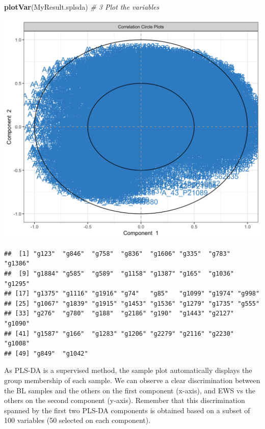 \documentclass[]{book}
\newenvironment{Shaded}{\begin{snugshade}}{\end{snugshade}}
\newcommand{\KeywordTok}[1]{\textcolor[rgb]{0.13,0.29,0.53}{\textbf{#1}}}
\newcommand{\DataTypeTok}[1]{\textcolor[rgb]{0.13,0.29,0.53}{#1}}
\newcommand{\DecValTok}[1]{\textcolor[rgb]{0.00,0.00,0.81}{#1}}
\newcommand{\CommentTok}[1]{\textcolor[rgb]{0.56,0.35,0.01}{\textit{#1}}}
\newcommand{\OperatorTok}[1]{\textcolor[rgb]{0.81,0.36,0.00}{\textbf{#1}}}
\newcommand{\NormalTok}[1]{#1}
\theoremstyle{definition}
\theoremstyle{definition}
\theoremstyle{definition}
\theoremstyle{remark}
\begin{document}
\begin{Shaded}
\begin{Highlighting}[]
\KeywordTok{plotVar}\NormalTok{(MyResult.splsda)                            }\CommentTok{# 3 Plot the variables}
\end{Highlighting}
\end{Shaded}

\begin{center}\includegraphics[width=0.5\linewidth]{Figures/unnamed-chunk-2-2} \end{center}

\begin{Shaded}
\end{Shaded}

\begin{verbatim}
##  [1] "g123"  "g846"  "g758"  "g836"  "g1606" "g335"  "g783"  "g1386"
##  [9] "g1884" "g585"  "g589"  "g1158" "g1387" "g165"  "g1036" "g1295"
## [17] "g1375" "g1116" "g1916" "g74"   "g85"   "g1099" "g1974" "g998" 
## [25] "g1067" "g1839" "g1915" "g1453" "g1536" "g1279" "g1735" "g555" 
## [33] "g276"  "g780"  "g188"  "g2186" "g190"  "g1443" "g2127" "g1090"
## [41] "g1587" "g166"  "g1283" "g1206" "g2279" "g2116" "g2230" "g1008"
## [49] "g849"  "g1042"
\end{verbatim}

As PLS-DA is a supervised method, the sample plot automatically displays
the group membership of each sample. We can observe a clear
discrimination between the BL samples and the others on the first
component (x-axis), and EWS vs the others on the second component
(y-axis). Remember that this discrimination spanned by the first two
PLS-DA components is obtained based on a subset of 100 variables (50
selected on each component).
\end{document}

